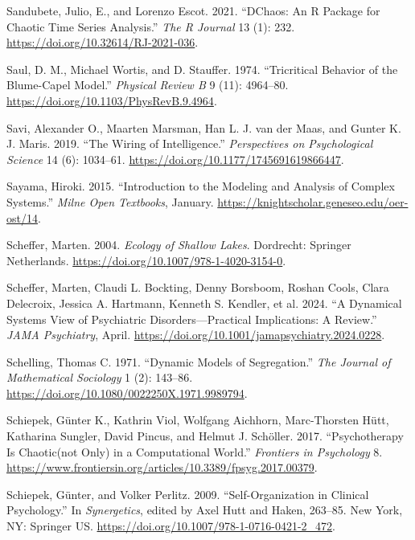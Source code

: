 \documentclass[
  a4paper,
  DIV=11,
  numbers=noendperiod,
  oneside]{scrreprt}
\newlength{\cslhangindent}
\newenvironment{CSLReferences}[2] %
 {\begin{list}{}{%
  \setlength{\itemindent}{0pt}
  \setlength{\leftmargin}{0pt}
  \setlength{\parsep}{0pt}
  \ifodd #1
   \setlength{\leftmargin}{\cslhangindent}
   \setlength{\itemindent}{-1\cslhangindent}
  \fi
  \setlength{\itemsep}{#2\baselineskip}}}
 {\end{list}}
\begin{document}
\begin{CSLReferences}{1}{0}
Sandubete, Julio, E., and Lorenzo Escot. 2021. {``{DChaos}: {An R
Package} for {Chaotic Time Series Analysis}.''} \emph{The R Journal} 13
(1): 232. \url{https://doi.org/10.32614/RJ-2021-036}.

Saul, D. M., Michael Wortis, and D. Stauffer. 1974. {``Tricritical
Behavior of the {Blume-Capel} Model.''} \emph{Physical Review B} 9 (11):
4964--80. \url{https://doi.org/10.1103/PhysRevB.9.4964}.

Savi, Alexander O., Maarten Marsman, Han L. J. van der Maas, and Gunter
K. J. Maris. 2019. {``The {Wiring} of {Intelligence}.''}
\emph{Perspectives on Psychological Science} 14 (6): 1034--61.
\url{https://doi.org/10.1177/1745691619866447}.

Sayama, Hiroki. 2015. {``Introduction to the Modeling and Analysis of
Complex Systems.''} \emph{Milne Open Textbooks}, January.
\url{https://knightscholar.geneseo.edu/oer-ost/14}.

Scheffer, Marten. 2004. \emph{Ecology of {Shallow Lakes}}. {Dordrecht}:
{Springer Netherlands}. \url{https://doi.org/10.1007/978-1-4020-3154-0}.

Scheffer, Marten, Claudi L. Bockting, Denny Borsboom, Roshan Cools,
Clara Delecroix, Jessica A. Hartmann, Kenneth S. Kendler, et al. 2024.
{``A {Dynamical Systems View} of {Psychiatric Disorders}---{Practical
Implications}: {A Review}.''} \emph{JAMA Psychiatry}, April.
\url{https://doi.org/10.1001/jamapsychiatry.2024.0228}.

Schelling, Thomas C. 1971. {``Dynamic Models of Segregation.''}
\emph{The Journal of Mathematical Sociology} 1 (2): 143--86.
\url{https://doi.org/10.1080/0022250X.1971.9989794}.

Schiepek, Günter K., Kathrin Viol, Wolfgang Aichhorn, Marc-Thorsten
Hütt, Katharina Sungler, David Pincus, and Helmut J. Schöller. 2017.
{``Psychotherapy Is Chaotic{\textemdash}(not Only) in a Computational
World.''} \emph{Frontiers in Psychology} 8.
\url{https://www.frontiersin.org/articles/10.3389/fpsyg.2017.00379}.

Schiepek, Günter, and Volker Perlitz. 2009. {``Self-{Organization} in
{Clinical Psychology}.''} In \emph{Synergetics}, edited by Axel Hutt and
Haken, 263--85. {New York, NY}: {Springer US}.
\url{https://doi.org/10.1007/978-1-0716-0421-2_472}.


\end{CSLReferences}
\end{document}
